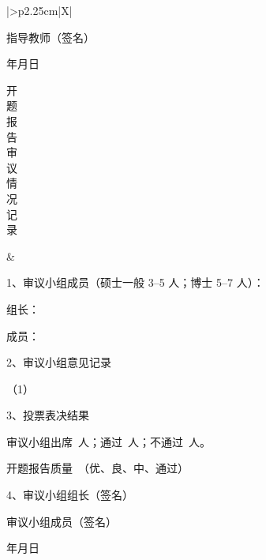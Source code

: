\begin{tabularx}{\FrameTabularWidth}{|>{\centering\arraybackslash}p{2.25cm}|X|}
{      \vfill
      \hfill 指导教师（签名）\sigspace\par
      \vspace{0.55cm}
      \hfill 年\hspace{1.2cm}月\hspace{1.2cm}日\hspace{0.8cm}\vspace{5pt}} \tabularnewline \hline
  \parbox[t][8.25cm][c]{2.05cm}{\centering 开\\题\\报\\告\\审\\议\\情\\况\\记\\录}
    & \begin{minipage}[t]{\linewidth}\vspace{0pt}%
      1、审议小组成员（硕士一般 3--5 人；博士 5--7 人）：\par
      \hspace{2em}组长：\par
      \hspace{2em}成员：\par\vspace{0.35cm}
      2、审议小组意见记录\par\vspace{0.7cm}
      （1）\par\vspace{0.55cm}
      3、投票表决结果\par
      \hspace{2em}审议小组出席\underline{\makebox[1.5cm]{}}\ 人；通过\underline{\makebox[1.5cm]{}}\ 人；不通过\underline{\makebox[1.5cm]{}}\ 人。\par
      \hspace{2em}开题报告质量\underline{\makebox[4.0cm]{}}\ （优、良、中、通过）\par\vspace{0.45cm}
      4、审议小组组长（签名）\par
      \hspace{2em}审议小组成员（签名）\par
      \vspace{1.0cm}
      \hfill 年\hspace{1.2cm}月\hspace{1.2cm}日\hspace{0.8cm}\end{minipage} \tabularnewline \hline

\end{tabularx}
